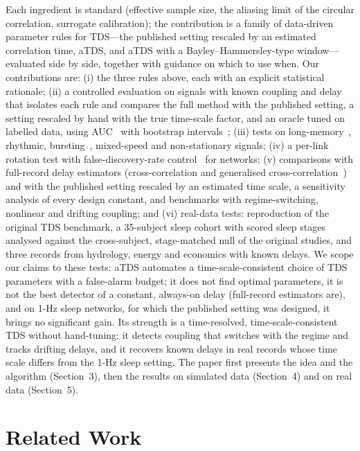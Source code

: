 \documentclass[11pt,a4paper]{article}
\begin{document}
Each ingredient is standard (effective sample size, the aliasing limit of the circular correlation, surrogate calibration); the contribution is a family of data-driven parameter rules for TDS---the published setting rescaled by an estimated correlation time, aTDS, and aTDS with a Bayley--Hammersley-type window---evaluated side by side, together with guidance on which to use when. Our contributions are: (i) the three rules above, each with an explicit statistical rationale; (ii) a controlled evaluation on signals with known coupling and delay that isolates each rule and compares the full method with the published setting, a setting rescaled by hand with the true time-scale factor, and an oracle tuned on labelled data, using AUC~\cite{Hanley1982MeaningUse} with bootstrap intervals~\cite{Efron1979BootstrapMethods}; (iii) tests on long-memory~\cite{Davies1987TestsHurst,Peng1995QuantificationScaling}, rhythmic, bursting~\cite{Rulkov2002ModelingSpikingbursting}, mixed-speed and non-stationary signals; (iv) a per-link rotation test with false-discovery-rate control~\cite{Benjamini1995ControllingFalse} for networks; (v) comparisons with full-record delay estimators (cross-correlation and generalised cross-correlation~\cite{Knapp1976GeneralizedCorrelation,Carter1987CoherenceTime}) and with the published setting rescaled by an estimated time scale, a sensitivity analysis of every design constant, and benchmarks with regime-switching, nonlinear and drifting coupling; and (vi) real-data tests: reproduction of the original TDS benchmark, a 35-subject sleep cohort with scored sleep stages analysed against the cross-subject, stage-matched null of the original studies, and three records from hydrology, energy and economics with known delays. We scope our claims to these tests: aTDS automates a time-scale-consistent choice of TDS parameters with a false-alarm budget; it does not find optimal parameters, it is not the best detector of a constant, always-on delay (full-record estimators are), and on 1-Hz sleep networks, for which the published setting was designed, it brings no significant gain. Its strength is a time-resolved, time-scale-consistent TDS without hand-tuning: it detects coupling that switches with the regime and tracks drifting delays, and it recovers known delays in real records whose time scale differs from the 1-Hz sleep setting. The paper first presents the idea and the algorithm (Section~3), then the results on simulated data (Section~4) and on real data (Section~5).

\section{Related Work}
\label{sec:related_work}
\end{document}
